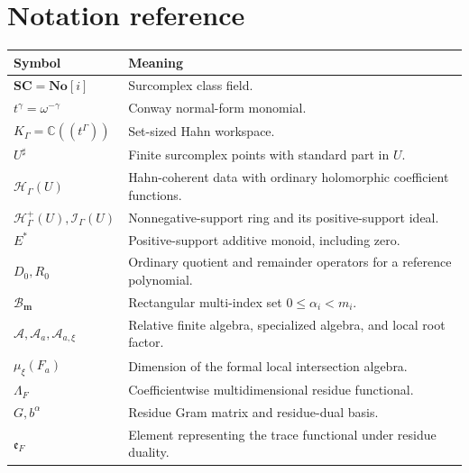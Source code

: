 \documentclass[11pt,oneside]{article}
\numberwithin{equation}{section}
\theoremstyle{definition}
\theoremstyle{remark}\newtheorem{remark}[theorem]{Remark}
\newcommand{\C}{\mathbb C}
\newcommand{\No}{\mathbf{No}}
\newcommand{\SC}{\mathbf{SC}}
\newcommand{\HH}{\mathcal H_{\Gamma}}
\newcommand{\Hp}{\mathcal H^{+}_{\Gamma}}
\newcommand{\Ip}{\mathcal I_{\Gamma}}
\newcommand{\sh}{^{\sharp}}
\newcommand{\boxset}{\mathcal B_{\boldsymbol m}}
\begin{document}
\section{Notation reference}
{\small
\begin{longtable}{@{}L{0.29\textwidth}L{0.62\textwidth}@{}}
\toprule
Symbol & Meaning\\
\midrule
\endhead
\(\SC=\No[i]\) & Surcomplex class field.\\[0.25em]
\(t^\gamma=\omega^{-\gamma}\) & Conway normal-form monomial.\\[0.25em]
\(K_\Gamma=\C((t^\Gamma))\) & Set-sized Hahn workspace.\\[0.25em]
\(U\sh\) & Finite surcomplex points with standard part in \(U\).\\[0.25em]
\(\HH(U)\) & Hahn-coherent data with ordinary holomorphic coefficient functions.\\[0.25em]
\(\Hp(U),\Ip(U)\) & Nonnegative-support ring and its positive-support ideal.\\[0.25em]
\(E^*\) & Positive-support additive monoid, including zero.\\[0.25em]
\(D_0,R_0\) & Ordinary quotient and remainder operators for a reference polynomial.\\[0.25em]
\(\boxset\) & Rectangular multi-index set \(0\leq\alpha_i<m_i\).\\[0.25em]
\(\mathcal A,\mathcal A_a,\mathcal A_{a,\xi}\) & Relative finite algebra, specialized algebra, and local root factor.\\[0.25em]
\(\mu_\xi(F_a)\) & Dimension of the formal local intersection algebra.\\[0.25em]
\(\Lambda_F\) & Coefficientwise multidimensional residue functional.\\[0.25em]
\(G,b^\alpha\) & Residue Gram matrix and residue-dual basis.\\[0.25em]
\(\mathfrak e_F\) & Element representing the trace functional under residue duality.\\
\bottomrule
\end{longtable}

}
\clearpage
\end{document}

